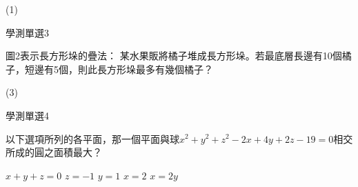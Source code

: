 \begin{QUESTIONS}
\begin{QUESTION}
        \begin{QTAGS}\end{QTAGS}
        \begin{QANS}
            (1)
        \end{QANS}
        \begin{QSOLLIST}
        \end{QSOLLIST}
        \begin{QEMPTYSPACE}
        \end{QEMPTYSPACE}
    \end{QUESTION}
    \begin{QUESTION}
        \begin{ExamInfo}{84}{學測}{單選}{3}
        \end{ExamInfo}
        \begin{ExamAnsRateInfo}{}{}{}{}
        \end{ExamAnsRateInfo}
        \begin{QBODY}
            圖2表示長方形垛的疊法：
            某水果販將橘子堆成長方形垛。若最底層長邊有10個橘子，短邊有5個，則此長方形垛最多有幾個橘子？
            \begin{QOPS}
            \end{QOPS}         
        \end{QBODY}
        \begin{QFROMS}
        \end{QFROMS}
        \begin{QTAGS}\end{QTAGS}
        \begin{QANS}
            (3)
        \end{QANS}
        \begin{QSOLLIST}
        \end{QSOLLIST}
        \begin{QEMPTYSPACE}
        \end{QEMPTYSPACE}
    \end{QUESTION}
    \begin{QUESTION}
        \begin{ExamInfo}{84}{學測}{單選}{4}
        \end{ExamInfo}
        \begin{ExamAnsRateInfo}{}{}{}{}
        \end{ExamAnsRateInfo}
        \begin{QBODY}
            以下選項所列的各平面，那一個平面與球${{x}^{2}}+{{y}^{2}}+{{z}^{2}}-2x+4y+2z-19=0$相交所成的圓之面積最大？
            \begin{QOPS}
            \QOP $x+y+z=0$
            \QOP $z=-1$
            \QOP $y=1$
            \QOP $x=2$
            \QOP $x=2y$
        \end{QOPS}
            

\end{QBODY}
\end{QUESTION}
\end{QUESTIONS}
